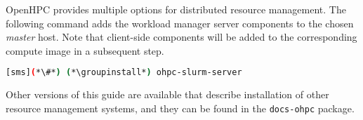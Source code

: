 OpenHPC provides multiple options for distributed resource management. 
The following command adds the \SLURM{} workload manager server components to the
chosen {\em master} host. Note that client-side components will be added to
the corresponding compute image in a subsequent step.

\begin{lstlisting}[language=bash,keywords={}]
[sms](*\#*) (*\groupinstall*) ohpc-slurm-server
\end{lstlisting}

 Other versions of this guide are available that describe installation of other 
 resource management systems, and they can be found in the \texttt{docs-ohpc}
 package.
